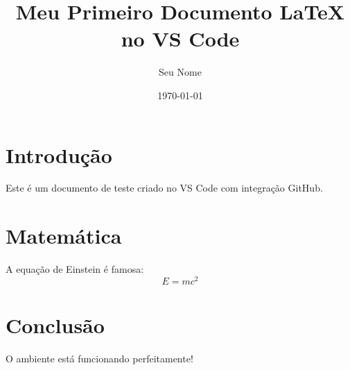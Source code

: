 \documentclass[12pt,a4paper]{article}
\title{Meu Primeiro Documento \LaTeX{} no VS Code}
\author{Seu Nome}
\date{\today}
\begin{document}
\maketitle

\section{Introdução}
Este é um documento de teste criado no VS Code com integração GitHub.

\section{Matemática}
A equação de Einstein é famosa:
\begin{equation}
    E = mc^2
\end{equation}

\section{Conclusão}
O ambiente está funcionando perfeitamente!
\end{document}
